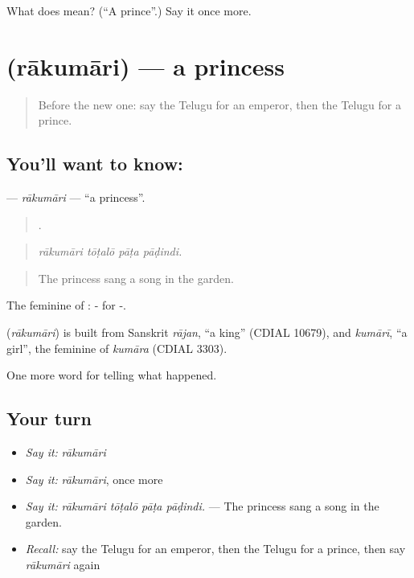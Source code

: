\begin{tcolorbox}[breakable,colback=teal!4,colframe=teal!35!black,title={Before you move on}]
What does  mean? (\textquotedblleft{}A prince\textquotedblright{}.) Say it once more.
\end{tcolorbox}
\section[\texorpdfstring{\te{రాకుమారి} (rākumāri)}{రాకుమారి (rākumāri)}]{ (rākumāri) — a princess}

\label{lesson:TE-C359-rakumari}



\begin{quote}
Before the new one: say the Telugu for an emperor, then the Telugu for a prince.
\end{quote}

\subsection*{You'll want to know: }
\textbf{} — \emph{rākumāri} — \textquotedblleft{}a princess\textquotedblright{}.

\begin{quote}
   .
\end{quote}

\begin{quote}
\emph{rākumāri tōṭalō pāṭa pāḍindi.}
\end{quote}

\begin{quote}
The princess sang a song in the garden.
\end{quote}

The feminine of : - for -.

\begin{cousinweb}
\textbf{} (\emph{rākumāri}) is built from Sanskrit \emph{rājan}, \textquotedblleft{}a king\textquotedblright{} (CDIAL 10679), and \emph{kumārī}, \textquotedblleft{}a girl\textquotedblright{}, the feminine of \emph{kumāra} (CDIAL 3303).
\end{cousinweb}

\begin{grammarlens}[title={What you've built}]
One more word for telling what happened.
\end{grammarlens}

\subsection*{Your turn}
\begin{itemize}
\raggedright
  \item \emph{Say it:} \emph{rākumāri}
  \item \emph{Say it:} \emph{rākumāri}, once more
  \item \emph{Say it:} \emph{rākumāri tōṭalō pāṭa pāḍindi.} — The princess sang a song in the garden.
  \item \emph{Recall:} say the Telugu for an emperor, then the Telugu for a prince, then say \emph{rākumāri} again
\end{itemize}

